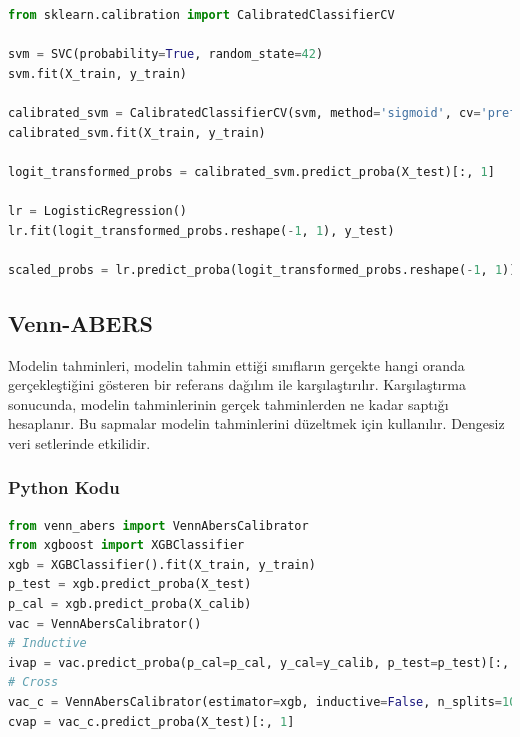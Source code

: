 \begin{lstlisting}[language=Python, caption=Scikit-learn'de Platt's Method örneği.]
from sklearn.calibration import CalibratedClassifierCV

svm = SVC(probability=True, random_state=42)
svm.fit(X_train, y_train)

calibrated_svm = CalibratedClassifierCV(svm, method='sigmoid', cv='prefit')
calibrated_svm.fit(X_train, y_train)

logit_transformed_probs = calibrated_svm.predict_proba(X_test)[:, 1] 

lr = LogisticRegression()
lr.fit(logit_transformed_probs.reshape(-1, 1), y_test)

scaled_probs = lr.predict_proba(logit_transformed_probs.reshape(-1, 1))[:, 1]
\end{lstlisting}

\newpage

\subsection{Venn-ABERS}
Modelin tahminleri, modelin tahmin ettiği sınıfların gerçekte hangi oranda gerçekleştiğini gösteren bir referans dağılım ile karşılaştırılır. Karşılaştırma sonucunda, modelin tahminlerinin gerçek tahminlerden ne kadar saptığı hesaplanır. Bu sapmalar modelin tahminlerini düzeltmek için kullanılır. Dengesiz veri setlerinde etkilidir.

\subsubsection{Python Kodu}

\begin{lstlisting}[language=Python, caption=venn\_abers kütüphanesi ile örnek.]
from venn_abers import VennAbersCalibrator
from xgboost import XGBClassifier
xgb = XGBClassifier().fit(X_train, y_train)
p_test = xgb.predict_proba(X_test)
p_cal = xgb.predict_proba(X_calib)
vac = VennAbersCalibrator()
# Inductive
ivap = vac.predict_proba(p_cal=p_cal, y_cal=y_calib, p_test=p_test)[:, 1]
# Cross
vac_c = VennAbersCalibrator(estimator=xgb, inductive=False, n_splits=10).fit(X_train, y_train)
cvap = vac_c.predict_proba(X_test)[:, 1]
\end{lstlisting}

\newpage

